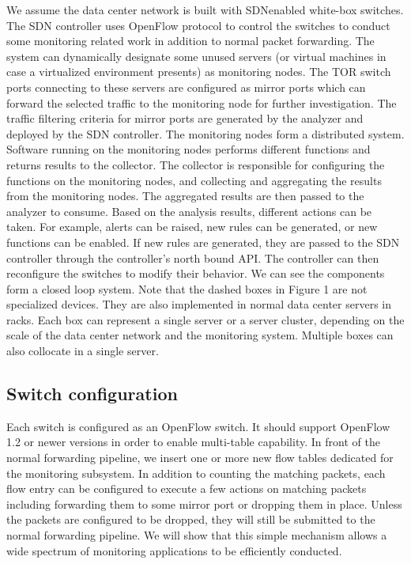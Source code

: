 \documentclass{acm_proc_article-sp}
\begin{document}
We assume the data center network is built with SDNenabled white-box switches. The SDN controller uses OpenFlow protocol to control the switches to conduct some monitoring related work in addition to normal packet forwarding. The system can dynamically designate some unused servers (or virtual machines in case a virtualized environment presents) as monitoring nodes. The TOR switch ports connecting to these servers are configured as mirror ports which can forward the selected traffic to the monitoring node for further investigation. The traffic filtering criteria for mirror ports are generated by the analyzer and deployed by the SDN controller. The monitoring nodes form a distributed system. Software running on the monitoring nodes performs different functions and returns results to the collector. The collector is responsible for configuring the functions on the monitoring nodes, and collecting and aggregating the results from the monitoring nodes. The aggregated results are then passed to the analyzer to consume. Based on the analysis results, different actions can be taken. For example, alerts can be raised, new rules can be generated, or new functions can be enabled. If new rules are generated, they are passed to the SDN controller through the controller’s north bound API. The controller can then reconfigure the switches to modify their behavior. We can see the components form a closed loop system. Note that the dashed boxes in Figure 1 are not specialized devices. They are also implemented in normal data center servers in racks. Each box can represent a single server or a server cluster, depending on the scale of the data center network and the monitoring system. Multiple boxes can also collocate in a single server.\\
\subsection{Switch configuration}
Each switch is configured as an OpenFlow switch. It should support OpenFlow 1.2 or newer versions in order to enable multi-table capability. In front of the normal forwarding pipeline, we insert one or more new flow tables dedicated for the monitoring subsystem. In addition to counting the matching packets, each flow entry can be configured to execute a few actions on matching packets including forwarding them to some mirror port or dropping them in place. Unless the packets are configured to be dropped, they will still be submitted to the normal forwarding pipeline. We will show that this simple mechanism allows a wide spectrum of monitoring applications to be efficiently conducted.\\
\end{document}
